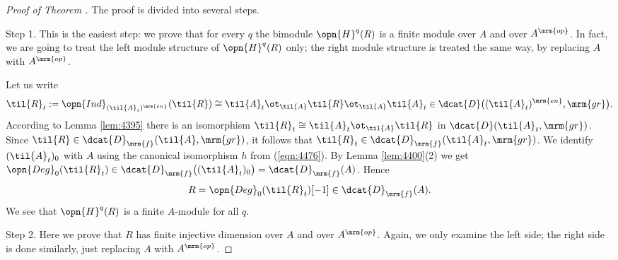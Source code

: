 \begin{proof}[Proof of Theorem \tup{\ref{thm:4395}}]
The proof is divided into several steps. 

\smallskip \noindent
Step 1. This is the easiest step: we prove that for every $q$ the bimodule 
$\opn{H}^q(R)$ is a finite module over $A$ and over $A^{\mrm{op}}$. 
In fact, we are going to treat the left module structure of $\opn{H}^q(R)$ 
only; the right module structure is treated the same way, by replacing $A$ 
with $A^{\mrm{op}}$.

Let us write
\[ \til{R}_t := \opn{Ind}_{(\til{A}_t)^{\mrm{en}}}(\til{R}) \cong 
\til{A}_t \ot_{\til{A}} \til{R} \ot_{\til{A}} \til{A}_t \in 
\dcat{D} \bigl( (\til{A}_t)^{\mrm{en}}, \mrm{gr} \bigr) . \]
According to Lemma \ref{lem:4395} there is an isomorphism 
$\til{R}_t \cong \til{A}_t \ot_{\til{A}} \til{R}$ 
in $\dcat{D}(\til{A}_t, \mrm{gr})$. 
Since $\til{R} \in \dcat{D}_{\mrm{f}}(\til{A}, \mrm{gr})$, 
it follows that 
$\til{R}_t \in \dcat{D}_{\mrm{f}}(\til{A}_t, \mrm{gr})$. 
We identify $(\til{A}_t)_0$ with $A$ using the canonical isomorphism $h$
from (\ref{eqn:4476}). 
By Lemma \ref{lem:4400}(2) we get 
$\opn{Deg}_0(\til{R}_t) \in \dcat{D}_{\mrm{f}} \bigl( (\til{A}_t)_0 \bigr) 
= \dcat{D}_{\mrm{f}}(A)$.
Hence 
\begin{equation} \label{eqn:4426}
R = \opn{Deg}_0(\til{R}_t)[-1] \in \dcat{D}_{\mrm{f}}(A) . 
\end{equation}
We see that $\opn{H}^q(R)$ is a finite $A$-module for all $q$. 

\medskip \noindent
Step 2. Here we prove that $R$ has finite injective dimension over $A$ and over 
$A^{\mrm{op}}$. Again, we only examine the left side; the right side is done 
similarly, just replacing $A$ with $A^{\mrm{op}}$.


\end{proof}

